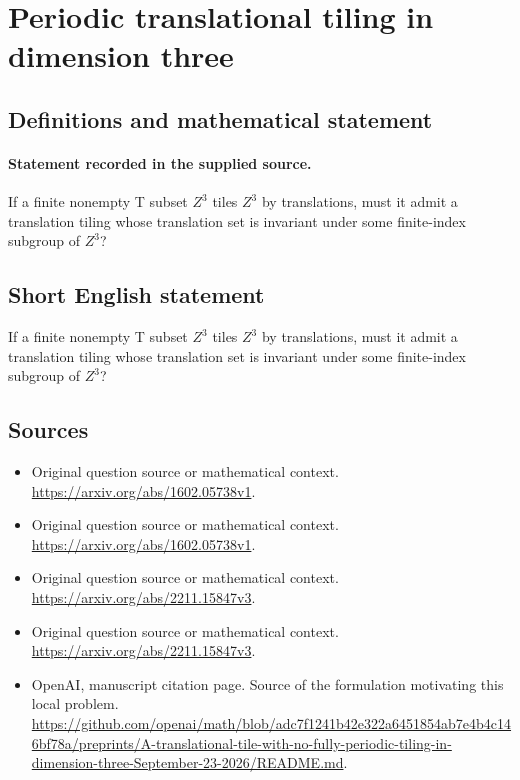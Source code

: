 \documentclass[11pt]{article}
\begin{document}
\section*{Periodic translational tiling in dimension three}\label{30007099}
\subsection{Definitions and mathematical statement}
\paragraph{Statement recorded in the supplied source.}
If a finite nonempty T subset $Z^3$ tiles $Z^3$ by translations, must it admit a translation tiling whose translation set is invariant under some finite-index subgroup of $Z^3$?
\subsection{Short English statement}
If a finite nonempty T subset $Z^3$ tiles $Z^3$ by translations, must it admit a translation tiling whose translation set is invariant under some finite-index subgroup of $Z^3$?
\subsection{Sources}
\begin{itemize}
\item[S1] Original question source or mathematical context.
\url{https://arxiv.org/abs/1602.05738v1}.
\item[S2] Original question source or mathematical context.
\url{https://arxiv.org/abs/1602.05738v1}.
\item[S3] Original question source or mathematical context.
\url{https://arxiv.org/abs/2211.15847v3}.
\item[S4] Original question source or mathematical context.
\url{https://arxiv.org/abs/2211.15847v3}.
\item[S5] OpenAI, manuscript citation page. Source of the formulation motivating this local problem.
\url{https://github.com/openai/math/blob/adc7f1241b42e322a6451854ab7e4b4c146bf78a/preprints/A-translational-tile-with-no-fully-periodic-tiling-in-dimension-three-September-23-2026/README.md}.
\end{itemize}
\end{document}
